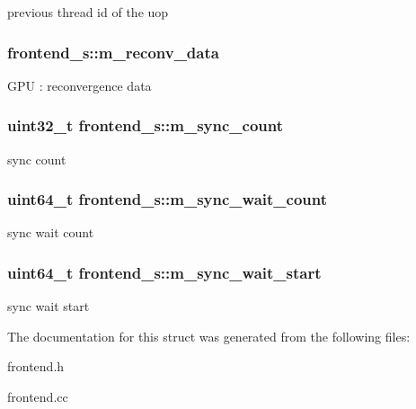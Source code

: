 \label{structfrontend__s_a4fec072ee6013132f739110f1928447c}
previous thread id of the uop \hypertarget{structfrontend__s_a8cff27ec3c03d739f4dccce4dcb31072}{
\subsubsection[{m\_\-reconv\_\-data}]{ {\bf frontend\_\-s::m\_\-reconv\_\-data}}}
\label{structfrontend__s_a8cff27ec3c03d739f4dccce4dcb31072}
GPU : reconvergence data \hypertarget{structfrontend__s_afc743be3a1d726ca426c592a458fc29f}{
\subsubsection[{m\_\-sync\_\-count}]{\setlength{\rightskip}{0pt plus 5cm}uint32\_\-t {\bf frontend\_\-s::m\_\-sync\_\-count}}}
\label{structfrontend__s_afc743be3a1d726ca426c592a458fc29f}
sync count \hypertarget{structfrontend__s_a35c7f50fd30081b6a017241177098407}{
\subsubsection[{m\_\-sync\_\-wait\_\-count}]{\setlength{\rightskip}{0pt plus 5cm}uint64\_\-t {\bf frontend\_\-s::m\_\-sync\_\-wait\_\-count}}}
\label{structfrontend__s_a35c7f50fd30081b6a017241177098407}
sync wait count \hypertarget{structfrontend__s_a6f7aa38f4fe827d94f5aab6a201363ac}{
\subsubsection[{m\_\-sync\_\-wait\_\-start}]{\setlength{\rightskip}{0pt plus 5cm}uint64\_\-t {\bf frontend\_\-s::m\_\-sync\_\-wait\_\-start}}}
\label{structfrontend__s_a6f7aa38f4fe827d94f5aab6a201363ac}
sync wait start 

The documentation for this struct was generated from the following files:\begin{DoxyCompactItemize}
\item 
frontend.h\item 
frontend.cc\end{DoxyCompactItemize}
